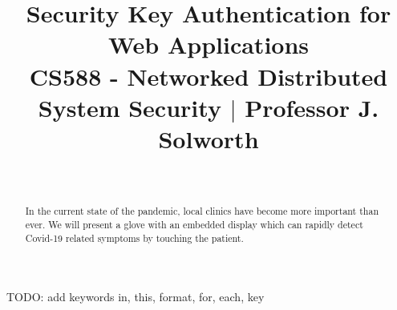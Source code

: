 \documentclass[10pt, conference]{IEEEtran}
\begin{document}
\title{\textbf{Security Key Authentication for Web Applications}\\
{\small CS588 - Networked Distributed System Security $\mid$ Professor J. Solworth}
}

\author{
\\
}

\maketitle

\begin{abstract}
    In the current state of the pandemic, local clinics have become more important than ever. We will present a glove with an embedded display which can rapidly detect Covid-19 related symptoms by touching the patient.
\end{abstract}

\begin{IEEEkeywords}
    TODO: add keywords in, this, format, for, each, key
\end{IEEEkeywords}





\vspace{12pt}



\end{document}
